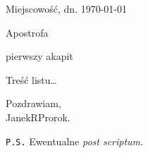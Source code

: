 \documentclass[11pt,oneside,notitlepage,a4paper]{mwart}
\begin{document}

\hfill Miejscowość, dn. \today
\begin{center}
		\noindent \huge{Apostrofa} %
	\end{center} \bigskip
	
\noindent pierwszy akapit\smallskip

Treść listu\ldots

\bigskip \hfill 
	\begin{minipage}{0.5\linewidth}
		\centering Pozdrawiam,\\\smallskip
 		JanekR\underline{\hspace{1.2ex}}Prorok.
 	\end{minipage}
\bigskip\bigskip\bigskip

\texttt{P.S.} Ewentualne \emph{post scriptum}.
\end{document}
